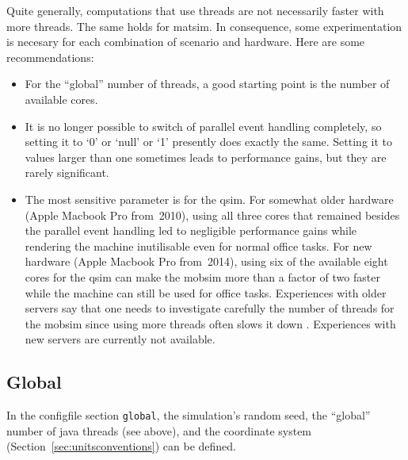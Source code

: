 Quite generally, computations that use threads are not necessarily faster with more threads. The same holds for \gls{matsim}.  In consequence, some experimentation is necesary for each combination of scenario and hardware.  Here are some recommendations:
\begin{itemize}\styleItemize

\item For the ``global'' number of threads, a good starting point is the number of available cores.

\item It is no longer possible to switch of parallel event handling completely, so setting it to `0' or `null' or `1' presently does exactly the same.  Setting it to values larger than one sometimes leads to performance gains, but they are rarely significant.

\item The most sensitive parameter is for the \gls{qsim}.
  For somewhat older hardware (\eg Apple Macbook Pro from~2010), using all three cores that remained besides the parallel event handling led to negligible performance gains while rendering the machine inutilisable even for normal office tasks.
  For new hardware (\eg Apple Macbook Pro from~2014), using six of the available eight cores for the \gls{qsim} can make the \gls{mobsim} more than a factor of two faster while the machine can still be used for office tasks.
  Experiences with older servers say that one needs to investigate carefully the number of threads for the \gls{mobsim} since using more threads often slows it down \citep{Dobler_PhDThesis_2013}.
  Experiences with new servers are currently not available. 

\end{itemize}



\subsection{Global}
\label{sec:using-global}
In the \gls{configfile} section \lstinline|global|, the simulation's random seed, the ``global'' number of \gls{java} threads (see above), and the coordinate system (\cf Section~\ref{sec:unitsconventions}) can be defined. 

